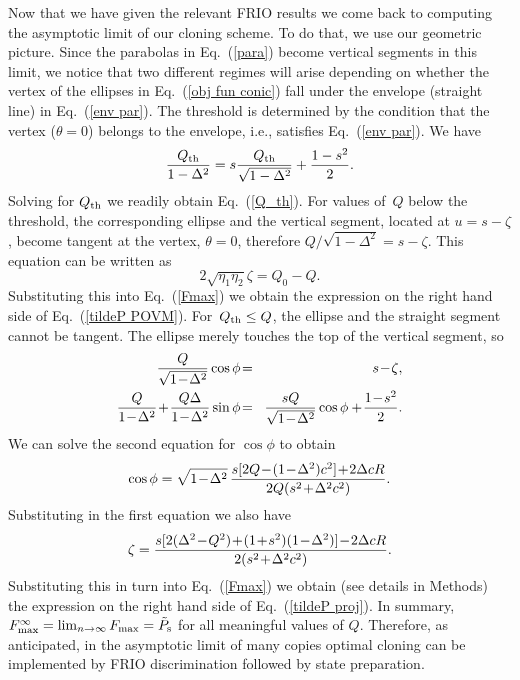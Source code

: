 \documentclass[aps,pra,twocolumn,showpacs]{revtex4-1}
\begin{document}
Now that we have given the relevant FRIO results we come back to computing the asymptotic limit of our cloning scheme.  To do that, we use our geometric picture. Since the parabolas in Eq.~(\ref{para}) become vertical segments in this limit, we notice that two different regimes will arise depending on whether the vertex of the ellipses in Eq.~(\ref{obj fun conic}) fall under the envelope (straight line) in Eq.~(\ref{env par}). The threshold is determined by the condition that the vertex ($\theta=0$) belongs to the envelope, i.e., satisfies Eq.~(\ref{env par}). We have
%
\begin{equation}
{Q_{\rm th}\over1-\Delta^2}=s{Q_{\rm th}\over\sqrt{1-\Delta^2}}+{1-s^2\over2}.
\end{equation}
%
Solving for $Q_{\rm th}$ we readily obtain Eq.~(\ref{Q_th}). For values of~$Q$ below the threshold, the corresponding ellipse and the vertical segment, located at $u=s-\zeta$, become tangent at the vertex, $\theta=0$, therefore $Q/\sqrt{1-\Delta^2}=s-\zeta$. This equation can be written as 
%
\begin{equation}
2\sqrt{\eta_1\eta_2}\zeta=Q_0-Q.
\end{equation}
%
Substituting this into Eq.~(\ref{Fmax}) we obtain the expression on the right hand side of Eq.~(\ref{tildeP POVM}).  For~$Q_{\rm th}\le Q$, the ellipse and the straight segment cannot be tangent. The ellipse merely touches the top of the vertical segment, so
%
\begin{eqnarray}
{Q\over\sqrt{1\!-\!\Delta^2}}\cos\phi\!&=&\!s\!-\!\zeta,\\
{Q\over1\!-\!\Delta^2}\!+\!{Q\Delta\over1\!-\!\Delta^2}\sin\phi\!&=&\!{sQ\over\sqrt{1\!-\!\Delta^2}}\cos\phi+\!{1\!-\!s^2\over2}.
\end{eqnarray}
%
We can solve the second equation for $\cos\phi$ to obtain
%
\begin{equation}
\cos\phi=\sqrt{1\!-\!\Delta^2}\,{s[2Q\!-\!(1\!-\!\Delta^2)c^2]\!+\!2\Delta c R\over2Q(s^2\!+\!\Delta^2 c^2)}.
\end{equation}
%
Substituting in the first equation we also have
%
\begin{equation}
\zeta={s[2(\Delta^2\!-\!Q^2)\!+\!(1\!+\! s^2)(1\!-\!\Delta^2)]\!-\!2\Delta c R\over2(s^2\!+\!\Delta^2 c^2)}.
\end{equation}
%
Substituting this in turn into Eq.~(\ref{Fmax}) we obtain (see details in Methods) the expression on the right hand side of Eq.~(\ref{tildeP proj}). In summary, $F^{\infty}_{\rm max}=\lim_{n\to\infty }F_{\rm max}=\tilde P_{\rm s}$ for all meaningful values of $Q$. Therefore, as anticipated, in the asymptotic limit of many copies optimal cloning can be implemented by FRIO discrimination followed by state preparation. 
\end{document}
